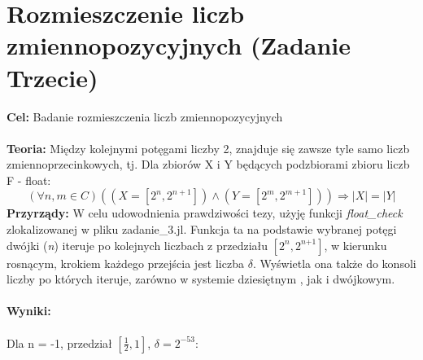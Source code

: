 \documentclass{article}
\begin{document}
\section{Rozmieszczenie liczb zmiennopozycyjnych (Zadanie Trzecie)}
\noindent \textbf{Cel:} Badanie rozmieszczenia liczb zmiennopozycyjnych \\\\
\noindent \textbf{Teoria:} Między kolejnymi potęgami liczby 2, znajduje się zawsze tyle samo liczb zmiennoprzecinkowych, tj. Dla zbiorów X i Y będących podzbiorami zbioru liczb F - float:
$$(\forall n,m \in C)((X = [2^n,2^{n+1}]) \land (Y = [2^m,2^{m+1}])) \Rightarrow |X| = |Y|$$
\noindent \textbf{Przyrządy:} W celu udowodnienia prawdziwości tezy, użyję funkcji \textit{float\_check} zlokalizowanej w pliku zadanie\_3.jl. Funkcja ta na podstawie wybranej potęgi dwójki (\textit{n}) iteruje po kolejnych liczbach z przedziału $[2^{\textit{n}}, 2^{\textit{n+1}}]$, w kierunku rosnącym, krokiem każdego przejścia jest liczba $\delta$. Wyświetla ona także do konsoli liczby po których iteruje, zarówno w systemie dziesiętnym , jak i dwójkowym.\\\\
\newpage
\noindent \textbf{Wyniki:}\\\\
Dla n = -1, przedział $[\frac{1}{2},1]$, $\delta = 2^{-53}$:
\end{document}
